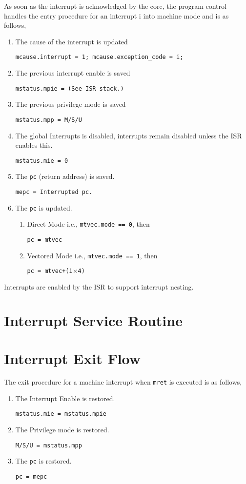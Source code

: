 As soon as the interrupt is acknowledged by the core, the program control handles the entry procedure for an interrupt i into machine mode and is as follows,
\begin{enumerate}
    \item The cause of the interrupt is updated
    
    \texttt{mcause.interrupt = 1; mcause.exception\_code = i;}
    \item The previous interrupt enable is saved
    
    \texttt{mstatus.mpie = (See ISR stack.)}
    \item The previous privilege mode is saved
    
    \texttt{mstatus.mpp = M/S/U}
    \item The global Interrupts is disabled, interrupts remain disabled unless the ISR enables this.
    
    \texttt{mstatus.mie = 0}
    \item The \texttt{pc} (return address) is saved.
    
    \texttt{mepc = Interrupted pc.}
    \item The \texttt{pc} is updated.
    \begin{enumerate}
        \item Direct Mode i.e., \texttt{mtvec.mode == 0}, then 

        \texttt{pc = mtvec}
        \item Vectored Mode i.e.,  \texttt{mtvec.mode == 1}, then 
        
        \texttt{pc = mtvec+(i$\times$4)}
    \end{enumerate}
\end{enumerate}

Interrupts are enabled by the ISR to support interrupt nesting.

\section{Interrupt Service Routine}
\label{sec:isr}

\section{Interrupt Exit Flow}
\label{sec:interrupt-exit-flow}

The exit procedure for a machine interrupt when \texttt{mret} is executed is as follows,

\begin{enumerate}
    \item The Interrupt Enable is restored.
    
    \texttt{mstatus.mie = mstatus.mpie}
    \item The Privilege mode is restored.
    
    \texttt{M/S/U = mstatus.mpp}
    \item The \texttt{pc} is restored.
    
    \texttt{pc = mepc}
\end{enumerate}

